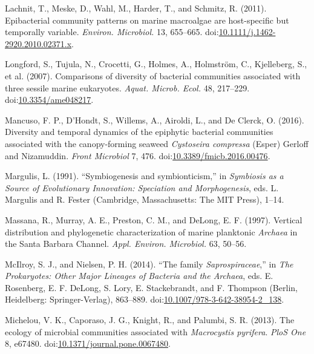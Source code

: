 \documentclass[12pt,]{article}
\begin{document}
\leavevmode\hypertarget{ref-Lachnit2011}{}%
Lachnit, T., Meske, D., Wahl, M., Harder, T., and Schmitz, R. (2011).
Epibacterial community patterns on marine macroalgae are host-specific
but temporally variable. \emph{Environ. Microbiol.} 13, 655--665.
doi:\href{https://doi.org/10.1111/j.1462-2920.2010.02371.x}{10.1111/j.1462-2920.2010.02371.x}.

\leavevmode\hypertarget{ref-Longford2007}{}%
Longford, S., Tujula, N., Crocetti, G., Holmes, A., Holmström, C.,
Kjelleberg, S., et al. (2007). Comparisons of diversity of bacterial
communities associated with three sessile marine eukaryotes.
\emph{Aquat. Microb. Ecol.} 48, 217--229.
doi:\href{https://doi.org/10.3354/ame048217}{10.3354/ame048217}.

\leavevmode\hypertarget{ref-Mancuso2016}{}%
Mancuso, F. P., D'Hondt, S., Willems, A., Airoldi, L., and De Clerck, O.
(2016). Diversity and temporal dynamics of the epiphytic bacterial
communities associated with the canopy-forming seaweed \emph{Cystoseira
compressa} (Esper) Gerloff and Nizamuddin. \emph{Front Microbiol} 7,
476.
doi:\href{https://doi.org/10.3389/fmicb.2016.00476}{10.3389/fmicb.2016.00476}.

\leavevmode\hypertarget{ref-Margulis1991}{}%
Margulis, L. (1991). ``Symbiogenesis and symbionticism,'' in
\emph{Symbiosis as a Source of Evolutionary Innovation: Speciation and
Morphogenesis}, eds. L. Margulis and R. Fester (Cambridge,
Massachusetts: The MIT Press), 1--14.

\leavevmode\hypertarget{ref-Massana1997}{}%
Massana, R., Murray, A. E., Preston, C. M., and DeLong, E. F. (1997).
Vertical distribution and phylogenetic characterization of marine
planktonic \emph{Archaea} in the Santa Barbara Channel. \emph{Appl.
Environ. Microbiol.} 63, 50--56.

\leavevmode\hypertarget{ref-McIlroy2014}{}%
McIlroy, S. J., and Nielsen, P. H. (2014). ``The family
\emph{Saprospiraceae},'' in \emph{The Prokaryotes: Other Major Lineages
of Bacteria and the Archaea}, eds. E. Rosenberg, E. F. DeLong, S. Lory,
E. Stackebrandt, and F. Thompson (Berlin, Heidelberg: Springer-Verlag),
863--889.
doi:\href{https://doi.org/10.1007/978-3-642-38954-2_138}{10.1007/978-3-642-38954-2\_138}.

\leavevmode\hypertarget{ref-Michelou2013}{}%
Michelou, V. K., Caporaso, J. G., Knight, R., and Palumbi, S. R. (2013).
The ecology of microbial communities associated with \emph{Macrocystis
pyrifera}. \emph{PloS One} 8, e67480.
doi:\href{https://doi.org/10.1371/journal.pone.0067480}{10.1371/journal.pone.0067480}.
\end{document}
